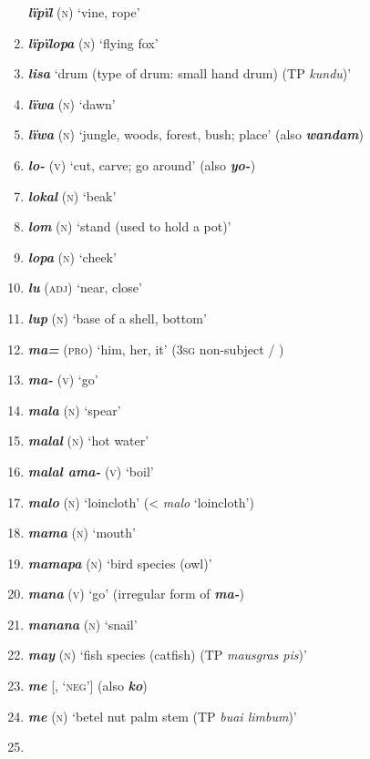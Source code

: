 \begin{enumerate}[noitemsep, label={}, align=left, widest=190, labelsep=1ex,leftmargin=*,itemindent=-10pt]
\textbf{\textit{lïpïl}} (\textsc{n}) ‘vine, rope’ \item
\textbf{\textit{lïpïlopa}} (\textsc{n}) ‘flying fox’ \item
\textbf{\textit{lisa}} ‘drum (type of drum: small hand drum) (TP \textit{kundu})’ \item
\textbf{\textit{lïwa}} (\textsc{n}) ‘dawn’ \item
\textbf{\textit{lïwa}} (\textsc{n}) ‘jungle, woods, forest, bush; place’ (also \textbf{\textit{wandam}}) \item
\textbf{\textit{lo-}} (\textsc{v}) ‘cut, carve; go around’ (also \textbf{\textit{yo-}}) \item
\textbf{\textit{lokal}} (\textsc{n}) ‘beak’ \item
\textbf{\textit{lom}} (\textsc{n}) ‘stand (used to hold a pot)’ \item
\textbf{\textit{lopa}} (\textsc{n}) ‘cheek’ \item
\textbf{\textit{lu}} (\textsc{adj}) ‘near, close’ \item
\textbf{\textit{lup}} (\textsc{n}) ‘base of a shell, bottom’ \item
\textbf{\textit{ma=}} (\textsc{pro}) ‘him, her, it’ (3\textsc{sg} non-subject  /  ) \item
\textbf{\textit{ma-}} (\textsc{v}) ‘go’ \item
\textbf{\textit{mala}} (\textsc{n}) ‘spear’ \item
\textbf{\textit{malal}} (\textsc{n}) ‘hot water’ \item
\textbf{\textit{malal ama-}} (\textsc{v}) ‘boil’ \item
\textbf{\textit{malo}} (\textsc{n}) ‘loincloth’ (<  \textit{malo} ‘loincloth’) \item
\textbf{\textit{mama}} (\textsc{n}) ‘mouth’ \item
\textbf{\textit{mamapa}} (\textsc{n}) ‘bird species (owl)’ \item
\textbf{\textit{mana}} (\textsc{v}) ‘go’ (irregular  form of \textbf{\textit{ma-}}) \item
\textbf{\textit{manana}} (\textsc{n}) ‘snail’ \item
\textbf{\textit{may}} (\textsc{n}) ‘fish species (catfish) (TP \textit{mausgras pis})’ \item
\textbf{\textit{me}} [, ‘\textsc{neg}’] (also \textbf{\textit{ko}}) \item
\textbf{\textit{me}} (\textsc{n}) ‘betel nut palm stem (TP \textit{buai limbum})’ \item

\end{enumerate}
